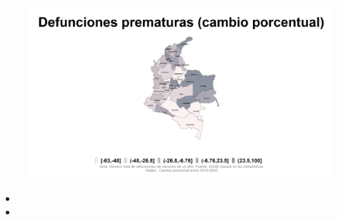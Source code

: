     \begin{figure}[H]
        \caption[Defunciones por enfermedades no transmisibles ]{\label{ent_} }
        \begin{center}
        \includegraphics[width=\textwidth,keepaspectratio]{img/var_280_map_change.png}
        \end{center}
    \end{figure}
            \begin{itemize}
                \item 
                \item 
                \end{itemize}




